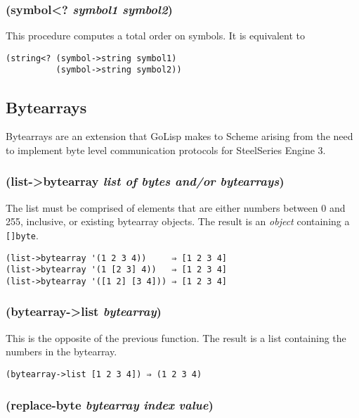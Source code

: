 \documentclass{article}
\begin{document}
\subsubsection{(symbol\textless{}? \emph{symbol1} \emph{symbol2})}

This procedure computes a total order on symbols. It is equivalent to

\begin{verbatim}
(string<? (symbol->string symbol1)
          (symbol->string symbol2))
\end{verbatim}

\subsection{Bytearrays}\label{sec:bytearrays}

Bytearrays are an extension that GoLisp makes to Scheme arising from the need to implement
byte level communication protocols for SteelSeries Engine 3.

\subsubsection{(list-\textgreater{}bytearray \emph{list of bytes and/or bytearrays})}

The list must be comprised of elements that are either numbers between 0 and 255, inclusive,
or existing bytearray objects. The result is an \emph{object} containing a \verb|[]byte|.

\begin{verbatim}
(list->bytearray '(1 2 3 4))     ⇒ [1 2 3 4]
(list->bytearray '(1 [2 3] 4))   ⇒ [1 2 3 4]
(list->bytearray '([1 2] [3 4])) ⇒ [1 2 3 4]
\end{verbatim}

\subsubsection{(bytearray-\textgreater{}list \emph{bytearray})}

This is the opposite of the previous function. The result is a list containing the numbers in
the bytearray.

\begin{verbatim}
(bytearray->list [1 2 3 4]) ⇒ (1 2 3 4)
\end{verbatim}

\subsubsection{(replace-byte \emph{bytearray} \emph{index} \emph{value})}
\end{document}
